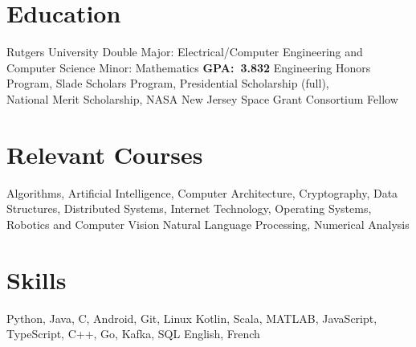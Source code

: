 \documentclass[11pt,letterpaper]{moderncv}
\begin{document}

\section{Education}

    {Rutgers University}
    {Double Major: Electrical/Computer Engineering and Computer Science}
    {Minor: Mathematics}
    {\textbf{GPA:~3.832}}
    {Engineering Honors Program, Slade Scholars Program, Presidential Scholarship (full),\\National Merit Scholarship, NASA New Jersey Space Grant Consortium Fellow}


\section{Relevant Courses}
       {Algorithms, Artificial Intelligence, Computer Architecture, Cryptography, Data Structures, Distributed Systems, Internet Technology, Operating Systems, Robotics and Computer Vision
       }
       {Natural Language Processing, Numerical Analysis}

\section{Skills}
       {Python, Java, C, Android, Git, Linux}
       {Kotlin, Scala, MATLAB, JavaScript, TypeScript, C++, Go, Kafka, SQL}
       {English, French}


 
\end{document}
